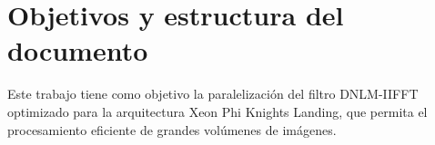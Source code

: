 \section{Objetivos y estructura del documento}


Este trabajo tiene como objetivo la paralelizaci\'on del filtro DNLM-IIFFT optimizado para la arquitectura Xeon Phi Knights Landing, que permita el procesamiento eficiente de grandes vol\'umenes de im\'agenes.
%

